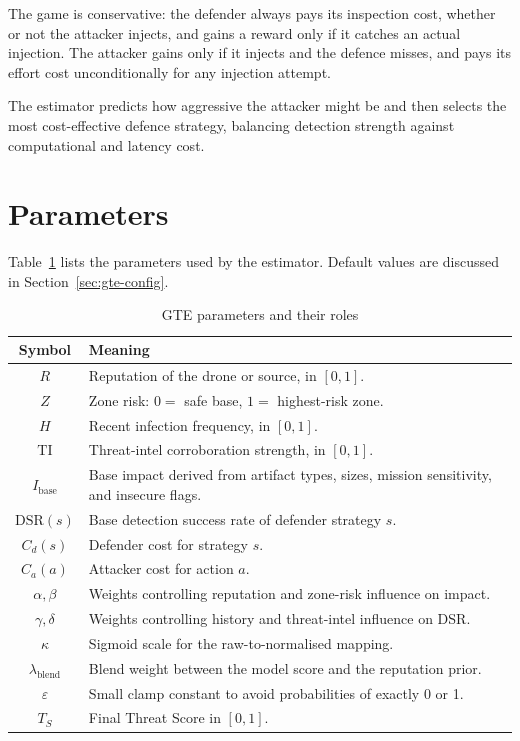 \documentclass[12pt, a4paper]{report}
\begin{document}
The game is conservative: the defender always pays its inspection cost,
whether or not the attacker injects, and gains a reward only if it
catches an actual injection. The attacker gains only if it injects and
the defence misses, and pays its effort cost unconditionally for any
injection attempt.

The estimator predicts how aggressive the attacker might be and then
selects the most cost-effective defence strategy, balancing detection
strength against computational and latency cost.

\section{Parameters}

Table~\ref{tab:gte-params} lists the parameters used by the estimator.
Default values are discussed in Section~\ref{sec:gte-config}.

\begin{table}[H]
\centering
\caption{GTE parameters and their roles}
\label{tab:gte-params}
\begin{tabular}{|c|p{10cm}|}
\hline
\textbf{Symbol} & \textbf{Meaning} \\
\hline
$R$ & Reputation of the drone or source, in $[0, 1]$. \\
\hline
$Z$ & Zone risk: $0 =$ safe base, $1 =$ highest-risk zone. \\
\hline
$H$ & Recent infection frequency, in $[0, 1]$. \\
\hline
$\mathrm{TI}$ & Threat-intel corroboration strength, in $[0, 1]$. \\
\hline
$I_{\text{base}}$ & Base impact derived from artifact types, sizes, mission sensitivity, and insecure flags. \\
\hline
$\mathrm{DSR}(s)$ & Base detection success rate of defender strategy $s$. \\
\hline
$C_d(s)$ & Defender cost for strategy $s$. \\
\hline
$C_a(a)$ & Attacker cost for action $a$. \\
\hline
$\alpha, \beta$ & Weights controlling reputation and zone-risk influence on impact. \\
\hline
$\gamma, \delta$ & Weights controlling history and threat-intel influence on DSR. \\
\hline
$\kappa$ & Sigmoid scale for the raw-to-normalised mapping. \\
\hline
$\lambda_{\text{blend}}$ & Blend weight between the model score and the reputation prior. \\
\hline
$\varepsilon$ & Small clamp constant to avoid probabilities of exactly 0 or 1. \\
\hline
$T_S$ & Final Threat Score in $[0, 1]$. \\
\hline
\end{tabular}
\end{table}
\end{document}
